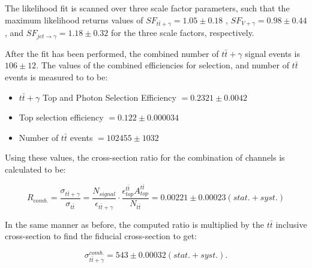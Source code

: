The likelihood fit is scanned over three scale factor parameters, such that the maximum likelihood returns values of $SF_{t\bar{t}+\gamma} = 1.05 \pm 0.18$ , $SF_{V+\gamma} = 0.98 \pm 0.44$, and $SF_{jet\to\gamma} = 1.18 \pm 0.32$  for the three scale factors, respectively.



After the fit has been performed, the combined number of $t\bar{t}+\gamma$ signal events is $106 \pm 12$. The values of the combined efficiencies for selection, and number of $t\bar{t}$ events is measured to to be:

\begin{itemize}
	\item $t\bar{t}+\gamma$ Top and Photon Selection Efficiency $= 0.2321 \pm 0.0042$
	\item Top selection efficiency $= 0.122 \pm 0.000034$
	\item Number of $t\bar{t}$ events $= 102455 \pm 1032$
\end{itemize}

Using these values, the cross-section ratio for the combination of channels is calculated to be:

\begin{equation}
	R_{comb.} = \frac{\sigma_{t\bar{t}+\gamma}}{\sigma_{t\bar{t}}} = \frac{N_{signal}}{\epsilon_{t\bar{t}+\gamma}} \cdot \frac{\epsilon^{t\bar{t}}_{top} A^{t\bar{t}}_{top}}{N_{t\bar{t}}} = 0.00221 \pm 0.00023 (stat. + syst.)
\end{equation}

In the same manner as before, the computed ratio is multiplied by the $t\bar{t}$ inclusive cross-section to find the fiducial cross-section to get:

\begin{equation}
	\sigma_{t\bar{t}+\gamma}^{comb.} = 543 \pm 0.00032 (stat.+syst.).
\end{equation}

